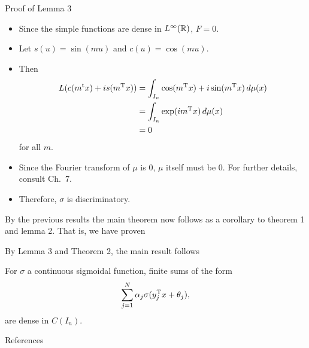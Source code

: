 \documentclass[11pt,letterpaper]{beamer}
\begin{document}
\begin{frame}{Proof of Lemma 3}
  \begin{itemize}
  \item Since the simple functions are dense in $L^\infty(\mathbb{R})$, $F=0$.
  \item Let $s(u)=\sin(mu)$ and $c(u)=\cos(mu)$.
  \item Then
    \begin{align*}
      L(c(m^{\mathrm{t}} x)+i s(m^{\mathrm{T}} x))
      &=\int_{I_n}\cos(m^{\mathrm{T}} x)+i\sin(m^{\mathrm{T}} x)\mathop{}\!d\mu(x)\\
      &=\int_{I_n}\exp(i m^{\mathrm{T}} x)\mathop{}\!d\mu(x)\\
      &=0
    \end{align*}
    for all $m$.
  \item Since the Fourier transform of $\mu$ is $0$, $\mu$ itself must be $0$.
    For further details, consult \cite{rudin} Ch.\ 7.
  \item Therefore, $\sigma$ is discriminatory.
  \end{itemize}
\end{frame}

\begin{frame}
  By the previous results the main theorem now follows as a corollary to theorem
  1 and lemma 2. That is, we have proven

  By Lemma 3 and Theorem 2, the main result follows
  \setcounter{theorem}{0}
  \begin{theorem}
    For $\sigma$ a continuous sigmoidal function, finite sums of the form
    \[
      \sum_{j=1}^N \alpha_j\sigma( y_j^{\mathrm{T}} x+\theta_j),
    \]
  are dense in $C(I_n)$.
  \end{theorem}
\end{frame}

\begin{frame}{References}
\printbibliography
\end{frame}
\end{document}
